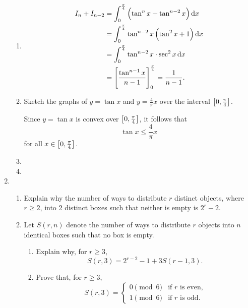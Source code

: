 \begin{enumerate}
\begin{solution} \
\begin{enumerate}[label=(\roman*)]
\item \begin{align*}
I_n+I_{n-2}
&=\int_0^\frac{\pi}{4}\left(\tan^nx+\tan^{n-2}x\right)\dd{x}\\
&=\int_0^\frac{\pi}{4}\tan^{n-2}x\left(\tan^2x+1\right)\dd{x}\\
&=\int_0^\frac{\pi}{4}\tan^{n-2}x\cdot\sec^2x\dd{x}\\
&=\left[\frac{\tan^{n-1}x}{n-1}\right]_0^\frac{\pi}{4}=\frac{1}{n-1}.
\end{align*}

\item Sketch the graphs of $y=\tan x$ and $y=\frac{4}{\pi}x$ over the interval $\left[0,\frac{\pi}{4}\right]$.

Since $y=\tan x$ is convex over $\left[0,\frac{\pi}{4}\right]$, it follows that
\[ \tan x\le\frac{4}{\pi}x \]
for all $x\in\left[0,\frac{\pi}{4}\right]$.

\item 

\item 
\end{enumerate}
\end{solution}

\item \begin{enumerate}[label=(\roman*)]
\item Explain why the number of ways to distribute $r$ distinct objects, where $r\ge2$, into 2 distinct boxes such that neither is empty is $2^r-2$.
\item Let $S(r,n)$ denote the number of ways to distribute $r$ objects into $n$ identical boxes such that no box is empty.
\begin{enumerate}[label=(\alph*)]
    \item Explain why, for $r\ge3$,
    \[ S(r,3)=2^{r-2}-1+3S(r-1,3). \]
    \item Prove that, for $r\ge3$,
    \[ S(r,3)=\begin{cases}
    0\pmod6 & \text{if }r\text{ is even,}\\
    1\pmod6 & \text{if }r\text{ is odd.}
    \end{cases} \]
\end{enumerate}
\end{enumerate}


\end{enumerate}
